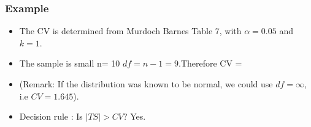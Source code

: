 ﻿\documentclass[a4]{beamer}
\begin{document}
\begin{frame}
\frametitle{Example}
\large
\begin{itemize}
\item The CV is determined from Murdoch Barnes Table 7, with $\alpha = 0.05$ and $k = 1$.
\item The sample is small n= 10  $df = n-1 = 9$.Therefore CV = 
\item (Remark: If the distribution was known to be normal, we could use $df = \infty$, i.e $CV = 1.645$).
\item Decision rule : Is $|TS| >CV$? Yes. 
\end{itemize}
\end{frame}

\end{document}
